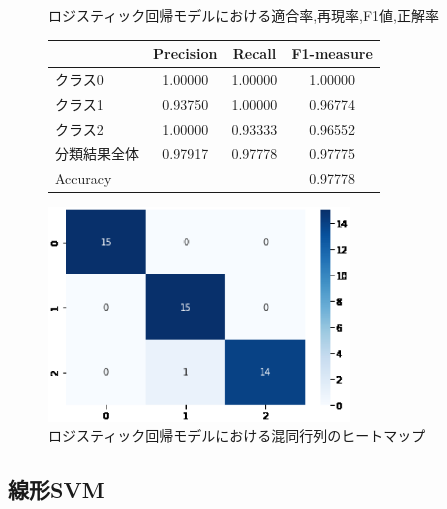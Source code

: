 \documentclass{jarticle}     %
\makeatletter
\newcommand{\tblcaption}[1]{\def\@captype{table}\caption{#1}}
\makeatother
\begin{document}
\begin{figure}[h]
  \def\@captype{table}
  \begin{minipage}[c]{.48\textwidth}
    \tblcaption{ロジスティック回帰モデルにおける適合率,再現率,F1値,正解率}
    \label{table:ロジスティック回帰}
    \centering
      \begin{tabular}{lccc}
        \hline
        & Precision  &  Recall &  F1-measure \\
        \hline
        クラス0  & 1.00000  & 1.00000 & 1.00000 \\
        クラス1  & 0.93750  & 1.00000 & 0.96774 \\
        クラス2  & 1.00000  & 0.93333 & 0.96552 \\
        分類結果全体  &  0.97917  &  0.97778 & 0.97775 \\
        \hline
        Accuracy & & & 0.97778\\
        \hline
      \end{tabular}
  \end{minipage}
  \hfill
  \begin{minipage}[c]{.48\textwidth}
    \includegraphics[width=80mm]{assets/lr_heatmap.eps}
  \caption{ロジスティック回帰モデルにおける混同行列のヒートマップ}
  \label{fig:ロジスティック}
  \end{minipage}
\end{figure}




\subsection{線形SVM}
\end{document}
